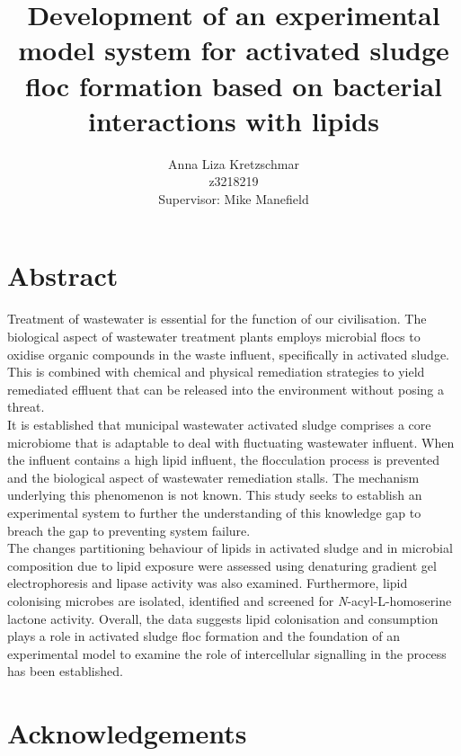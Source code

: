 \documentclass[twoside]{article}
\title{\textbf{Development of an experimental model system for activated sludge floc formation based on bacterial interactions with lipids}}
\author{Anna Liza Kretzschmar\\
        z3218219\\
        Supervisor: Mike Manefield}
\date{}
\begin{document}
\maketitle
\thispagestyle{plain}
\pagestyle{headings}
\setcounter{page}{1}


\section{Abstract}
Treatment of wastewater is essential for the function of our civilisation. The biological aspect of wastewater treatment plants employs microbial flocs to oxidise organic compounds in the waste influent, specifically in activated sludge. This is combined with chemical and physical remediation strategies to yield remediated effluent that can be released into the environment without posing a  threat. \\

It is established that municipal wastewater activated sludge comprises a core microbiome that is adaptable to deal with fluctuating wastewater influent. When the influent contains a high lipid influent, the flocculation process is prevented and the biological aspect of wastewater remediation stalls. The mechanism underlying this phenomenon is not known. This study seeks to establish an experimental system to further the understanding of this knowledge gap to breach the gap to preventing system failure. \\

The changes partitioning behaviour of lipids in activated sludge and in microbial composition due to lipid exposure were assessed using denaturing gradient gel electrophoresis and lipase activity was also examined. Furthermore, lipid colonising microbes are isolated, identified and screened for \emph{N}-acyl-L-homoserine lactone activity. Overall, the data suggests lipid colonisation and consumption plays a role in activated sludge floc formation and the foundation of an experimental model to examine the role of intercellular signalling in the process has been established.
 
\newpage
\section{Acknowledgements}
\thispagestyle{plain}

\end{document}
